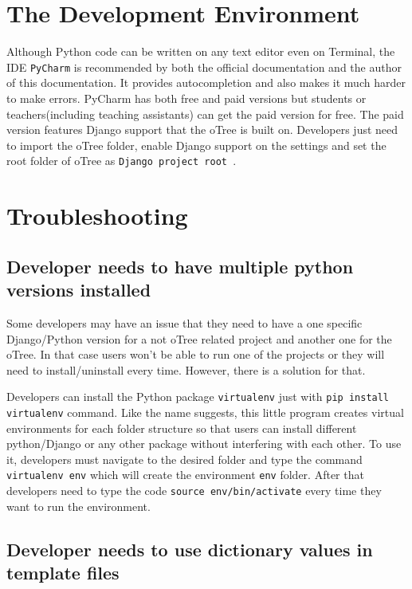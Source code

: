 \begin{appendix}
\section{The Development Environment}

Although Python code can be written on any text editor even on Terminal, the IDE \verb|PyCharm| is recommended by both the official documentation and the author of this documentation. It provides autocompletion and also makes it much harder to make errors. PyCharm has both free and paid versions but students or teachers(including teaching assistants) can get the paid version for free. The paid version features Django support that the oTree is built on. Developers just need to import the oTree folder, enable Django support on the settings and set the root folder of oTree as \verb|Django project root |. 

\section{Troubleshooting}

\subsection{Developer needs to have multiple python versions installed}

Some developers may have an issue that they need to have a one specific Django/Python version for a not oTree related project and another one for the oTree. In that case users won't be able to run one of the projects or they will need to install/uninstall every time. However, there is a solution for that. 

Developers can install the Python package \verb|virtualenv| just with \verb|pip install virtualenv| command. Like the name suggests, this little program creates virtual environments for each folder structure so that users can install different python/Django or any other package without interfering with each other. To use it, developers must navigate to the desired folder and type the command \verb|virtualenv env| which will create the environment \verb|env| folder. After that developers need to type the code \verb|source env/bin/activate| every time they want to run the environment. 

\subsection{Developer needs to use dictionary values in template files}


\end{appendix}
